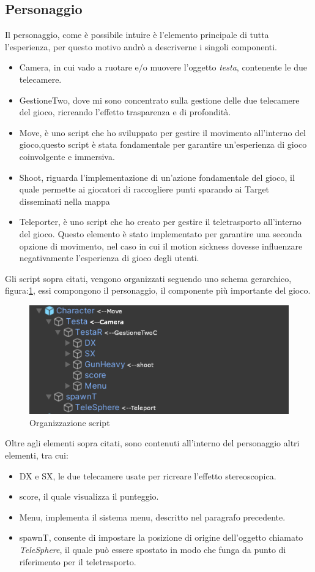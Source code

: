 \documentclass[
a4paper,
cleardoublepage=empty,
headings=twolinechapter,
numbers=autoenddot,
]{scrbook}
\begin{document}
	\subsection{Personaggio}
	Il personaggio, come è possibile intuire è l'elemento principale di tutta l'esperienza, per questo motivo andrò a descriverne i singoli componenti.
	\begin{itemize}
		\item Camera, in cui vado a ruotare e/o muovere l'oggetto \textit{testa}, contenente le due telecamere.
		\item GestioneTwo, dove mi sono concentrato sulla gestione delle due telecamere del gioco, ricreando l'effetto trasparenza e di profondità.
		\item Move, è uno script che ho sviluppato per gestire il movimento all'interno del gioco,questo script è stata fondamentale per garantire un'esperienza di gioco coinvolgente e immersiva.
		\item Shoot, riguarda l'implementazione di un'azione fondamentale del gioco, il quale permette ai giocatori di raccogliere punti sparando ai Target disseminati nella mappa
		\item Teleporter, è uno script che ho creato per gestire il teletrasporto all'interno del gioco. Questo elemento è stato implementato per garantire una seconda opzione di movimento, nel caso in cui il motion sickness\cite{mottion_sickness} dovesse influenzare negativamente l'esperienza di gioco degli utenti.
	\end{itemize}
	Gli script sopra citati, vengono organizzati seguendo uno schema gerarchico, figura:\ref{fig:script_character}, essi compongono il personaggio, il componente più importante del gioco.
	\begin{figure}[H]
		\centering
		\includegraphics[width=0.8\linewidth]{image/script_character}
		\caption{Organizzazione script}
		\label{fig:script_character}
	\end{figure}
	Oltre agli elementi sopra citati, sono contenuti all'interno del personaggio altri elementi, tra cui:
	\begin{itemize}
		\item DX e SX, le due telecamere usate per ricreare l'effetto stereoscopica.
		\item score, il quale visualizza il punteggio.
		\item Menu, implementa il sistema menu, descritto nel paragrafo precedente.
		\item spawnT, consente di impostare la posizione di origine dell'oggetto chiamato \textit{TeleSphere}, il quale può essere spostato in modo che funga da punto di riferimento per il teletrasporto.
	\end{itemize}
\end{document}
